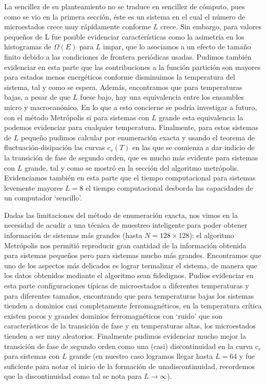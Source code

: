 \documentclass[%
 reprint,
 amsmath,amssymb,
 aps,
 pra,
]{revtex4-2}
\begin{document}
La sencillez de su planteamiento no se traduce en sencillez de cómputo, pues como se vio en la primera sección, éste es un sistema en el cual el número de microestados crece muy rápidamente conforme $L$ crece. Sin embargo, para valores pequeños de L fue posible evidenciar características como la asimetría en los histogramas de $\Omega(E)$ para $L$ impar, que lo asociamos a un efecto de tamaño finito debido a las condiciones de frontera periódicas usadas. Pudimos también evidenciar en esta parte que las contribuciones a la función partición son mayores para estados menos energéticos conforme disminuimos la temperatura del sistema, tal y como se espera. Además, encontramos que para temperaturas bajas, a pesar de que $L$ fuese bajo, hay una equivalencia entre los ensambles micro y macrocanónico. En lo que a esto concierne se podría investigar a futuro, con el método Metrópolis si para sistemas con $L$ grande esta equivalencia la podemos evidenciar para cualquier temperatura. Finalmente, para estos sistemas de $L$ pequeño pudimos calcular por enumeración exacta y usando el teorema de fluctuación-disipación las curvas $c_v(T)$ en las que se comienza a dar indicio de la transición de fase de segundo orden, que es mucho más evidente para sistemas con $L$ grande, tal y como se mostró en la sección del algoritmo metrópolis. Evidenciamos también en esta parte que el tiempo computacional para sistemas levemente mayores $L=8$ el tiempo computacional desborda las capacidades de un computador `sencillo'.

Dadas las limitaciones del método de enumeración exacta, nos vimos en la necesidad de acudir a una técnica de muestreo inteligente para poder obtener información de sistemas más grandes (hasta $N=128 \times 128$): el algoritmo Metrópolis nos permitió reproducir gran cantidad de la información obtenida para sistemas pequeños pero para sistemas mucho más grandes. Encontramos que uno de los aspectos más delicados es lograr termalizar el sistema, de manera que los datos obtenidos mediante el algoritmo sean fidedignos. Pudios evidenciar en esta parte configuraciones típicas de microestados a diferentes temperaturas y para diferentes tamaños, encontrando que para temperaturas bajas los sistemas tienden a dominios casi completamente ferromagnéticos, en la temperatura crítica existen pocos y grandes dominios ferromagnéticos con `ruido' que son característicos de la transición de fase y en temperaturas altas, los microestados tienden a ser muy aleatorios. Finalmente pudimos evidenciar mucho mejor la transición de fase de segundo orden como una (casi) discontinuidad en la curva $c_v$ para sistemas con $L$ grande (en nuestro caso logramos llegar hasta $L=64$ y fue suficiente para notar el inicio de la formación de unadiscontinuidad, recordemos que la discontinuidad como tal se nota para $L\rightarrow\infty$).
\end{document}
